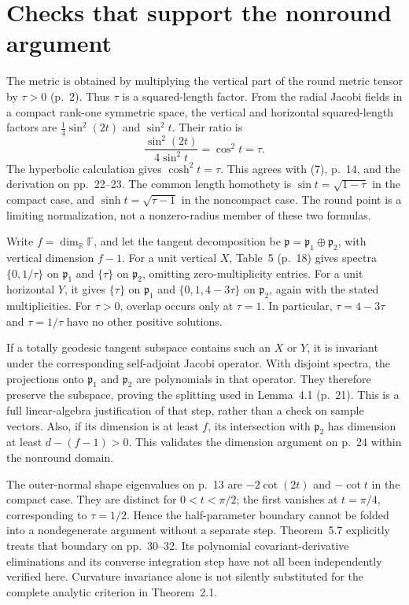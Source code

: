 \documentclass[10pt]{article}
\begin{document}
\section*{Checks that support the nonround argument}
The metric is obtained by multiplying the vertical part of the round metric tensor by \(\tau>0\) (p. 2). Thus \(\tau\) is a squared-length factor. From the radial Jacobi fields in a compact rank-one symmetric space, the vertical and horizontal squared-length factors are \(\frac14\sin^2(2t)\) and \(\sin^2t\). Their ratio is \[\frac{\sin^2(2t)}{4\sin^2t}=\cos^2t=\tau.\] The hyperbolic calculation gives \(\cosh^2t=\tau\). This agrees with (7), p. 14, and the derivation on pp. 22–23. The common length homothety is \(\sin t=\sqrt{1-\tau}\) in the compact case, and \(\sinh t=\sqrt{\tau-1}\) in the noncompact case. The round point is a limiting normalization, not a nonzero-radius member of these two formulas.\par
Write \(f=\dim_{\mathbb R}\mathbb F\), and let the tangent decomposition be \(\mathfrak p=\mathfrak p_1\oplus\mathfrak p_2\), with vertical dimension \(f-1\). For a unit vertical \(X\), Table 5 (p. 18) gives spectra \(\{0,1/\tau\}\) on \(\mathfrak p_1\) and \(\{\tau\}\) on \(\mathfrak p_2\), omitting zero-multiplicity entries. For a unit horizontal \(Y\), it gives \(\{\tau\}\) on \(\mathfrak p_1\) and \(\{0,1,4-3\tau\}\) on \(\mathfrak p_2\), again with the stated multiplicities. For \(\tau>0\), overlap occurs only at \(\tau=1\). In particular, \(\tau=4-3\tau\) and \(\tau=1/\tau\) have no other positive solutions.\par
If a totally geodesic tangent subspace contains such an \(X\) or \(Y\), it is invariant under the corresponding self-adjoint Jacobi operator. With disjoint spectra, the projections onto \(\mathfrak p_1\) and \(\mathfrak p_2\) are polynomials in that operator. They therefore preserve the subspace, proving the splitting used in Lemma 4.1 (p. 21). This is a full linear-algebra justification of that step, rather than a check on sample vectors. Also, if its dimension is at least \(f\), its intersection with \(\mathfrak p_2\) has dimension at least \(d-(f-1)>0\). This validates the dimension argument on p. 24 within the nonround domain.\par
The outer-normal shape eigenvalues on p. 13 are \(-2\cot(2t)\) and \(-\cot t\) in the compact case. They are distinct for \(0<t<\pi/2\); the first vanishes at \(t=\pi/4\), corresponding to \(\tau=1/2\). Hence the half-parameter boundary cannot be folded into a nondegenerate argument without a separate step. Theorem 5.7 explicitly treats that boundary on pp. 30–32. Its polynomial covariant-derivative eliminations and its converse integration step have not all been independently verified here. Curvature invariance alone is not silently substituted for the complete analytic criterion in Theorem 2.1.\par
\end{document}
